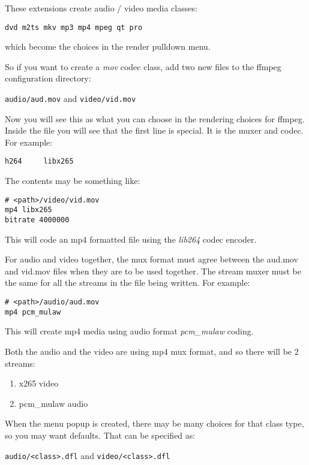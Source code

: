 These extensions create audio / video media classes:

\texttt{dvd \quad  m2ts \quad  mkv \quad  mp3 \quad  mp4 \quad  mpeg  \quad qt \quad  pro}

which become the choices in the render pulldown menu.

So if you want to create a \textit{mov} codec class, add two new files to the ffmpeg configuration directory:

\texttt{audio/aud.mov}  and  \texttt{video/vid.mov}

Now you will see this as what you can choose in the rendering choices for ffmpeg.
Inside the file you will see that the first line is special.  It is the muxer and codec.  For example:

\begin{lstlisting}[style=sh]
h264     libx265
\end{lstlisting}

The contents may be something like:

\begin{lstlisting}[style=sh]
# <path>/video/vid.mov 
mp4 libx265
bitrate 4000000
\end{lstlisting}

This will code an mp4 formatted file using the \textit{lib264} codec encoder.

For audio and video together, the mux format must agree between the aud.mov and vid.mov files when they are to be used together.  The stream muxer must be the same for all the streams in the file being written.
For example:

\begin{lstlisting}[style=sh]
# <path>/audio/aud.mov
mp4 pcm_mulaw
\end{lstlisting}

This will create mp4 media using audio format \textit{pcm\_mulaw} coding.

Both the audio and the video are using mp4 mux format, and so there will be 2 streams:
\begin{enumerate}
    \item x265 video
    \item pcm\_mulaw audio
\end{enumerate}

When the menu popup is created, there may be many choices for that class type, so you may want defaults.  That can be specified as:

\texttt{audio/<class>.dfl}  and  \texttt{video/<class>.dfl}

